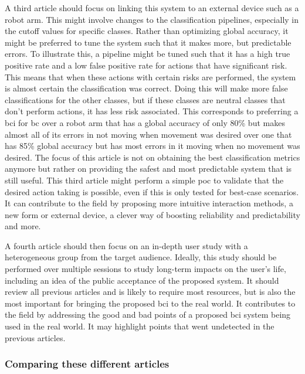 A third article should focus on linking this system to an external device such as a robot arm.
This might involve changes to the classification pipelines, especially in the cutoff values for specific classes.
Rather than optimizing global accuracy, it might be preferred to tune the system such that it makes more, but predictable errors.
To illustrate this, a pipeline might be tuned such that it has a high true positive rate and a low false positive rate for actions that have significant risk.
This means that when these actions with certain risks are performed, the system is almost certain the classification was correct.
Doing this will make more false classifications for the other classes, but if these classes are neutral classes that don't perform actions, it has less risk associated.
This corresponds to preferring a \gls{bci} for \gls{bc} over a robot arm that has a global accuracy of only 80\% but makes almost all of its errors in not moving when movement was desired over one that has 85\% global accuracy but has most errors in it moving when no movement was desired.
The focus of this article is not on obtaining the best classification metrics anymore but rather on providing the safest and most predictable system that is still useful.
This third article might perform a simple \gls{poc} to validate that the desired action taking is possible, even if this is only tested for best-case scenarios.
It can contribute to the field by proposing more intuitive interaction methods, a new form or external device, a clever way of boosting reliability and predictability and more.

A fourth article should then focus on an in-depth user study with a heterogeneous group from the target audience.
Ideally, this study should be performed over multiple sessions to study long-term impacts on the user's life, including an idea of the public acceptance of the proposed system.
It should review all previous articles and is likely to require most resources, but is also the most important for bringing the proposed \gls{bci} to the real world.
It contributes to the field by addressing the good and bad points of a proposed \gls{bci} system being used in the real world.
It may highlight points that went undetected in the previous articles. 


\subsubsection{Comparing these different articles}
\label{subsubsec:bci_opportunities_obstacles_lack_of_testing_comparing}

